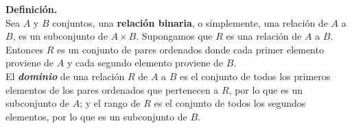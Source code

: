  \noindent \textbf{Definición.} \\
 \noindent  Sea $A$ y $B$ conjuntos, una \textbf{relación binaria}, o simplemente, una relación de $A$ a $B$, es un subconjunto de $A \times B$. Supongamos que $R$ es una relación de $A$ a $B$. Entonces $R$ es un conjunto de pares ordenados donde cada primer elemento proviene de $A$ y cada segundo elemento proviene de $B$. \\
    

 \noindent  El \textbf{\textit{dominio}} de una relación $R$ de $A$ a $B$ es el conjunto de todos los primeros elementos de los pares ordenados que pertenecen a $R$, por lo que es un subconjunto de $A$; y el rango de $R$ es el conjunto de todos los segundos elementos, por lo que es un subconjunto de $B$. \\





